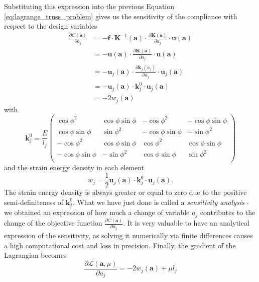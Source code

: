 Substituting this expression into the previous Equation \eqref{eq:lagrange_truss_problem} gives us the sensitivity of the compliance with respect to the design variables 
\begin{align}
    \frac{\partial C (\mathbf{a})}{\partial a_j} 
    &= - \mathbf{f} \cdot \mathbf{K}^{-1}(\mathbf{a}) \cdot \frac{\partial \mathbf{K} (\mathbf{a})}{\partial a_j} \cdot \mathbf{u} (\mathbf{a})  \\
    &= - \mathbf{u} (\mathbf{a}) \cdot \frac{\partial \mathbf{K} (\mathbf{a})}{\partial a_j} \cdot \mathbf{u} (\mathbf{a})  \\
    &= - \mathbf{u}_j (\mathbf{a}) \cdot \frac{\partial \mathbf{k}_j(a_j)}{\partial a_j} \cdot \mathbf{u}_j (\mathbf{a})  \\
    &= - \mathbf{u}_j (\mathbf{a}) \cdot \mathbf{k}^0_j \cdot \mathbf{u}_j (\mathbf{a})  \\
    &= - 2 w_j (\mathbf{a})
    \label{eq:compliance_sensitivity}
\end{align}
with 
\begin{equation}
    \mathbf{k}_j^0 = \frac{E}{l_j}
    \begin{pmatrix}
    \cos{\phi}^2 & \cos{\phi}\sin{\phi} & -\cos{\phi}^2 & -\cos{\phi}\sin{\phi} \\
    \cos{\phi}\sin{\phi} & \sin{\phi}^2 & -\cos{\phi}\sin{\phi} & -\sin{\phi}^2 \\
    -\cos{\phi}^2 & \cos{\phi}\sin{\phi} & \cos{\phi}^2 &\cos{\phi}\sin{\phi} \\
    -\cos{\phi}\sin{\phi} & -\sin{\phi}^2 & \cos{\phi}\sin{\phi} & \sin{\phi}^2 \\
    \end{pmatrix}
\end{equation}
and the strain energy density in each element 
\begin{equation}
    w_j = \frac{1}{2} \mathbf{u}_j (\mathbf{a}) \cdot \mathbf{k}^0_j \cdot \mathbf{u}_j (\mathbf{a}).
    \label{eq:element_strain_energy}
\end{equation}
The strain energy density is always greater or equal to zero due to the positive semi-definiteness of $\mathbf{k}^0_j$.
What we have just done is called a \emph{sensitivity analysis} - we obtained an expression of how much a change of variable $a_j$ contributes to the change of the objective function $\frac{\partial C (\mathbf{a})}{\partial a_j}$. It is very valuable to have an analytical expression of the sensitivity, as solving it numerically via finite differences causes a high computational cost and loss in precision.
Finally, the gradient of the Lagrangian becomes 
\begin{equation}
    \frac{\partial \mathcal{L} (\mathbf{a}, \mu)}{\partial a_j} 
    = - 2 w_j (\mathbf{a}) + \mu l_j
    \label{eq:lagrange_sensitivity}
\end{equation}

